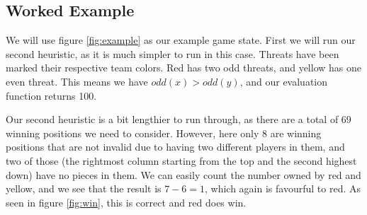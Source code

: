 \documentclass{article}
\begin{document}
	\subsection{Worked Example}
	We will use figure \ref{fig:example} as our example game state. First we will run our second heuristic, as it is much simpler to run in this case. Threats have been marked their respective team colors. Red has two odd threats, and yellow has one even threat. This means we have $odd(x) > odd(y)$, and our evaluation function returns 100.
	
	Our second heuristic is a bit lengthier to run through, as there are a total of 69 winning positions we need to consider. However, here only 8 are winning positions that are not invalid due to having two different players in them, and two of those (the rightmost column starting from the top and the second highest down) have no pieces in them. We can easily count the number owned by red and yellow, and we see that the result is $7-6 = 1$, which again is favourful to red. As seen in figure \ref{fig:win}, this is correct and red does win.
\end{document}
